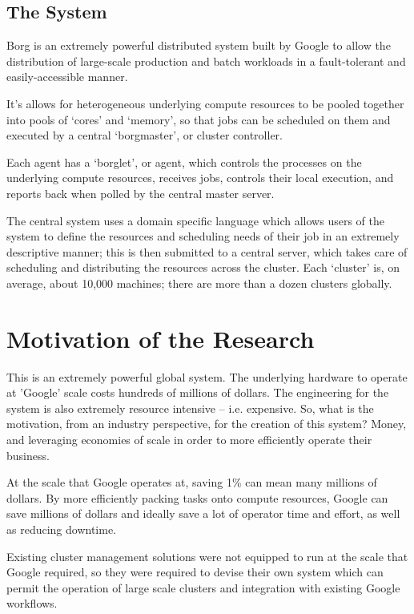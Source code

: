\documentclass[runningheads,a4paper]{llncs}
\begin{document}
\subsection{The System}
Borg is an extremely powerful distributed system built by Google to allow the distribution of large-scale production and batch workloads in a fault-tolerant and easily-accessible manner.  

It’s allows for heterogeneous underlying compute resources to be pooled together into pools of ‘cores’ and ‘memory’, so that jobs can be scheduled on them and executed by a central ‘borgmaster’, or cluster controller.

Each agent has a ‘borglet’, or agent, which controls the processes on the underlying compute resources, receives jobs, controls their local execution, and reports back when polled by the central master server.

The central system uses a domain specific language which allows users of the system to define the resources and scheduling needs of their job in an extremely descriptive manner; this is then submitted to a central server, which takes care of scheduling and distributing the resources across the cluster.  Each ‘cluster’ is, on average, about 10,000 machines; there are more than a dozen clusters globally.  

\section{Motivation of the Research}
This is an extremely powerful global system.  The underlying hardware to operate at 'Google' scale costs hundreds of millions of dollars.  The engineering for the system is also extremely resource intensive -- i.e. expensive.  So, what is the motivation, from an industry perspective, for the creation of this system?  Money, and leveraging economies of scale in order to more efficiently operate their business.

At the scale that Google operates at, saving 1\% can mean many millions of dollars.  By more efficiently packing tasks onto compute resources, Google can save  millions of dollars and ideally save a lot of operator time and effort, as well as reducing downtime. 

Existing cluster management solutions were not equipped to run at the scale that Google required, so they were required to  devise their own system which can permit the operation of large scale clusters and integration with existing Google workflows.
\end{document}
